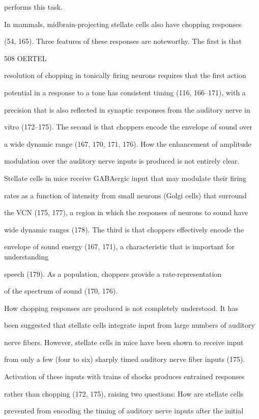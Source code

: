 \documentclass[10pt,a4paper]{article}
\begin{document}
performs this task.

In mammals, midbrain-projecting stellate cells also have chopping responses

(54, 165). Three features of these responses are noteworthy. The first is that

508 OERTEL

resolution of chopping in tonically firing neurons requires that the first
action

potential in a response to a tone has consistent timing (116, 166--171), with a

precision that is also reflected in synaptic responses from the auditory nerve
in

vitro (172--175). The second is that choppers encode the envelope of sound over

a wide dynamic range (167, 170, 171, 176). How the enhancement of amplitude

modulation over the auditory nerve inputs is produced is not entirely clear.

Stellate cells in mice receive GABAergic input that may modulate their firing

rates as a function of intensity from small neurons (Golgi cells) that surround

the VCN (175, 177), a region in which the responses of neurons to sound have

wide dynamic ranges (178). The third is that choppers effectively encode the

envelope of sound energy (167, 171), a characteristic that is important for
understanding

speech (179). As a population, choppers provide a rate-representation

of the spectrum of sound (170, 176).

How chopping responses are produced is not completely understood. It has

been suggested that stellate cells integrate input from large numbers of
auditory

nerve fibers. However, stellate cells in mice have been shown to receive input

from only a few (four to six) sharply timed auditory nerve fiber inputs (175).

Activation of these inputs with trains of shocks produces entrained responses

rather than chopping (172, 175), raising two questions: How are stellate cells

prevented from encoding the timing of auditory nerve inputs after the initial
\end{document}
